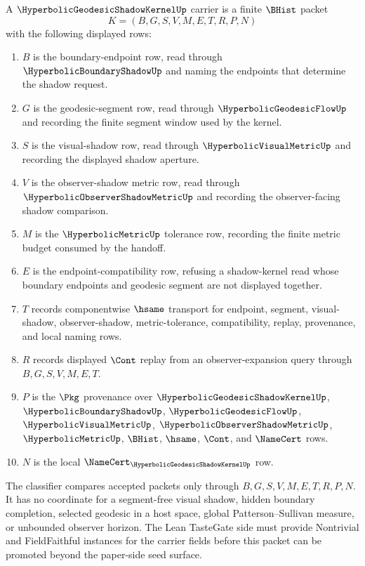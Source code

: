 \begin{definition}
\label{def:hyperbolic-geodesic-shadow-kernel-carrier}
A $\HyperbolicGeodesicShadowKernelUp$ carrier is a finite $\BHist$ packet
$$
K=(B,G,S,V,M,E,T,R,P,N)
$$
with the following displayed rows:
\begin{enumerate}
\item $B$ is the boundary-endpoint row, read through $\HyperbolicBoundaryShadowUp$ and naming the endpoints that determine the shadow request.
\item $G$ is the geodesic-segment row, read through $\HyperbolicGeodesicFlowUp$ and recording the finite segment window used by the kernel.
\item $S$ is the visual-shadow row, read through $\HyperbolicVisualMetricUp$ and recording the displayed shadow aperture.
\item $V$ is the observer-shadow metric row, read through $\HyperbolicObserverShadowMetricUp$ and recording the observer-facing shadow comparison.
\item $M$ is the $\HyperbolicMetricUp$ tolerance row, recording the finite metric budget consumed by the handoff.
\item $E$ is the endpoint-compatibility row, refusing a shadow-kernel read whose boundary endpoints and geodesic segment are not displayed together.
\item $T$ records componentwise $\hsame$ transport for endpoint, segment, visual-shadow, observer-shadow, metric-tolerance, compatibility, replay, provenance, and local naming rows.
\item $R$ records displayed $\Cont$ replay from an observer-expansion query through $B,G,S,V,M,E,T$.
\item $P$ is the $\Pkg$ provenance over $\HyperbolicGeodesicShadowKernelUp$, $\HyperbolicBoundaryShadowUp$, $\HyperbolicGeodesicFlowUp$, $\HyperbolicVisualMetricUp$, $\HyperbolicObserverShadowMetricUp$, $\HyperbolicMetricUp$, $\BHist$, $\hsame$, $\Cont$, and $\NameCert$ rows.
\item $N$ is the local $\NameCert_{\HyperbolicGeodesicShadowKernelUp}$ row.
\end{enumerate}
The classifier compares accepted packets only through $B,G,S,V,M,E,T,R,P,N$. It has no coordinate for a segment-free visual shadow, hidden boundary completion, selected geodesic in a host space, global Patterson--Sullivan measure, or unbounded observer horizon. The Lean TasteGate side must provide Nontrivial and FieldFaithful instances for the carrier fields before this packet can be promoted beyond the paper-side seed surface.
\end{definition}


